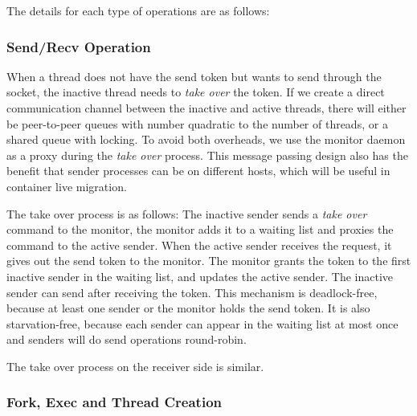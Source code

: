 
The details for each type of operations are as follows: %

\subsubsection{Send/Recv Operation}
\label{subsubsec:fork_rdwr}
\quad

When a thread does not have the send token but wants to send through the socket, the inactive thread needs to \emph{take over} the token.
If we create a direct communication channel between the inactive and active threads, there will either be peer-to-peer queues with number quadratic to the number of threads, or a shared queue with locking.
To avoid both overheads, we use the monitor daemon as a proxy during the \emph{take over} process.
This message passing design also has the benefit that sender processes can be on different hosts, which will be useful in container live migration.

The take over process is as follows:
The inactive sender sends a \emph{take over} command to the monitor, the monitor adds it to a waiting list and proxies the command to the active sender.
When the active sender receives the request, it gives out the send token to the monitor.
The monitor grants the token to the first inactive sender in the waiting list, and updates the active sender.
The inactive sender can send after receiving the token.
This mechanism is deadlock-free, because at least one sender or the monitor holds the send token.
It is also starvation-free, because each sender can appear in the waiting list at most once and senders will do send operations round-robin.

The take over process on the receiver side is similar.




\subsubsection{Fork, Exec and Thread Creation}
\label{subsubsec:fork_fork}
\quad

